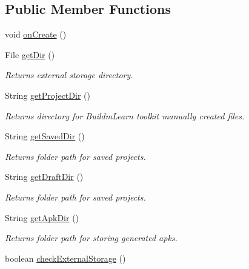\subsection*{Public Member Functions}
\begin{DoxyCompactItemize}
\item 
void \hyperlink{classorg_1_1buildmlearn_1_1toolkit_1_1ToolkitApplication_a4703aa50081e8b7996b0525e60fc2c1e}{on\+Create} ()
\item 
File \hyperlink{classorg_1_1buildmlearn_1_1toolkit_1_1ToolkitApplication_a823dd162b9fe7ea54066c15a001801b9}{get\+Dir} ()
\begin{DoxyCompactList}\small\item\em Returns external storage directory. \end{DoxyCompactList}\item 
String \hyperlink{classorg_1_1buildmlearn_1_1toolkit_1_1ToolkitApplication_a3ae286df3a66b894f4bff0c4da53ceff}{get\+Project\+Dir} ()
\begin{DoxyCompactList}\small\item\em Returns directory for Buildm\+Learn toolkit manually created files. \end{DoxyCompactList}\item 
String \hyperlink{classorg_1_1buildmlearn_1_1toolkit_1_1ToolkitApplication_a5f6a7d373de5d6d2c7cfacc9e6c86f47}{get\+Saved\+Dir} ()
\begin{DoxyCompactList}\small\item\em Returns folder path for saved projects. \end{DoxyCompactList}\item 
String \hyperlink{classorg_1_1buildmlearn_1_1toolkit_1_1ToolkitApplication_adc3bbc9280f06c06a7a7449caafa0ac5}{get\+Draft\+Dir} ()
\begin{DoxyCompactList}\small\item\em Returns folder path for saved projects. \end{DoxyCompactList}\item 
String \hyperlink{classorg_1_1buildmlearn_1_1toolkit_1_1ToolkitApplication_a976b0d6036419bd9382ffdca98b79fb4}{get\+Apk\+Dir} ()
\begin{DoxyCompactList}\small\item\em Returns folder path for storing generated apks. \end{DoxyCompactList}\item 
boolean \hyperlink{classorg_1_1buildmlearn_1_1toolkit_1_1ToolkitApplication_aa5e389a806e594641a9c13215d8e10c4}{check\+External\+Storage} ()

\end{DoxyCompactItemize}
